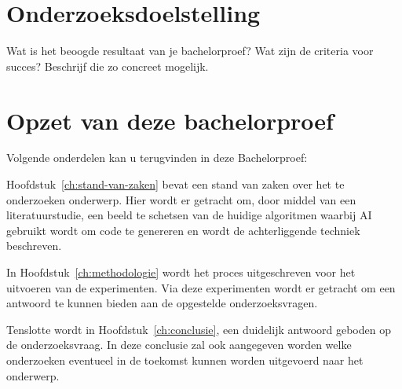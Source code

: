 
\section{Onderzoeksdoelstelling}
\label{sec:onderzoeksdoelstelling}

Wat is het beoogde resultaat van je bachelorproef? Wat zijn de criteria voor succes? Beschrijf die zo concreet mogelijk.

\section{Opzet van deze bachelorproef}
\label{sec:opzet-bachelorproef}

Volgende onderdelen kan u terugvinden in deze Bachelorproef:

Hoofdstuk~\ref{ch:stand-van-zaken} bevat een stand van zaken over het te onderzoeken onderwerp. Hier wordt er getracht om, door middel van een literatuurstudie, een beeld te schetsen van de huidige algoritmen waarbij AI gebruikt wordt om code te genereren en wordt de achterliggende techniek beschreven.

In Hoofdstuk~\ref{ch:methodologie} wordt het proces uitgeschreven voor het uitvoeren van de experimenten. Via deze experimenten wordt er getracht om een antwoord te kunnen bieden aan de opgestelde onderzoeksvragen.

Tenslotte wordt in Hoofdstuk~\ref{ch:conclusie}, een duidelijk antwoord geboden op de onderzoeksvraag. In deze conclusie zal ook aangegeven worden welke onderzoeken eventueel in de toekomst kunnen worden uitgevoerd naar het onderwerp.